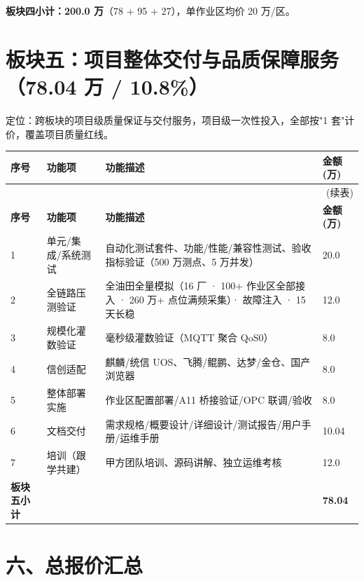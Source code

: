 \documentclass[11pt,a4paper]{ctexart}
\begin{document}
\textbf{板块四小计：200.0 万}（78 + 95 + 27），单作业区均价 20 万/区。

\section{板块五：项目整体交付与品质保障服务（78.04 万 / 10.8\%）}

定位：跨板块的项目级质量保证与交付服务，项目级一次性投入，全部按"1 套"计价，覆盖项目质量红线。

\begin{longtable}{p{1.2cm} p{3.8cm} p{7.1cm} p{1.7cm}}
\toprule
\textbf{序号} & \textbf{功能项} & \textbf{功能描述} & \textbf{金额(万)} \\
\midrule
\endfirsthead
\midrule
\multicolumn{4}{r}{(续表)} \\
\toprule
\textbf{序号} & \textbf{功能项} & \textbf{功能描述} & \textbf{金额(万)} \\
\midrule
\endhead
1 & 单元/集成/系统测试 & 自动化测试套件、功能/性能/兼容性测试、验收指标验证（500 万测点、5 万并发） & 20.0 \\
2 & 全链路压测验证 & 全油田全量模拟（16 厂 · 100+ 作业区全部接入 · 260 万+ 点位满频采集）· 故障注入 · 15 天长稳 & 12.0 \\
3 & 规模化灌数验证 & 毫秒级灌数验证（MQTT 聚合 QoS0） & 8.0 \\
4 & 信创适配 & 麒麟/统信 UOS、飞腾/鲲鹏、达梦/金仓、国产浏览器 & 8.0 \\
5 & 整体部署实施 & 作业区配置部署/A11 桥接验证/OPC 联调/验收 & 8.0 \\
6 & 文档交付 & 需求规格/概要设计/详细设计/测试报告/用户手册/运维手册 & 10.04 \\
7 & 培训（跟学共建） & 甲方团队培训、源码讲解、独立运维考核 & 12.0 \\
\midrule
\textbf{板块五小计} & & & \textbf{78.04} \\
\bottomrule
\end{longtable}

\section{六、总报价汇总}
\end{document}
